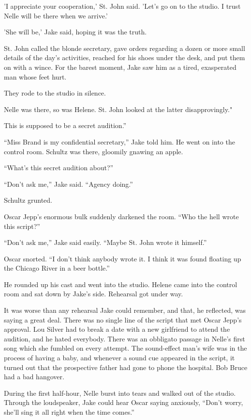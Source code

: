 \documentclass{novel}
\begin{document}
'I appreciate your cooperation,' St. John said. 'Let’s go on to the studio. I trust Nelle will be there when we arrive.'

'She will be,' Jake said, hoping it was the truth.

St. John called the blonde secretary, gave orders regarding a dozen or more small details of the day’s activities, reached for his shoes under the desk, and put them on with a wince. For the barest moment, Jake saw him as a tired, exasperated man whose feet hurt.

They rode to the studio in silence.

Nelle was there, so was Helene. St. John looked at the latter disapprovingly."

This is supposed to be a secret audition.”

“Miss Brand is my confidential secretary,” Jake told him. He went on into the control room. Schultz was there, gloomily gnawing an apple.

“What’s this secret audition about?”

“Don’t ask me,” Jake said. “Agency doing.”

Schultz grunted.

Oscar Jepp’s enormous bulk suddenly darkened the room. “Who the hell wrote this script?”

“Don’t ask me,” Jake said easily. “Maybe St. John wrote it himself.”

Oscar snorted. “I don’t think anybody wrote it. I think it was found floating up the Chicago River in a beer bottle.”

He rounded up his cast and went into the studio. Helene came into the control room and sat down by Jake’s side. Rehearsal got under way.

It was worse than any rehearsal Jake could remember, and that, he reflected, was saying a great deal. There was no single line of the script that met Oscar Jepp's approval. Lou Silver had to break a date with a new girlfriend to attend the audition, and he hated everybody. There was an obbligato passage in Nelle’s first song which she fumbled on every attempt. The sound-effect man’s wife was in the process of having a baby, and whenever a sound cue appeared in the script, it turned out that the prospective father had gone to phone the hospital. Bob Bruce had a bad hangover.

During the first half-hour, Nelle burst into tears and walked out of the studio. Through the loudspeaker, Jake could hear Oscar saying anxiously, “Don’t worry, she’ll sing it all right when the time comes.”
\end{document}
